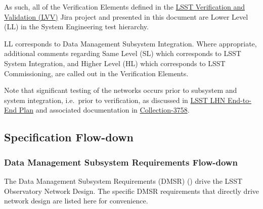 \documentclass[DM,lsstdraft,STS,toc]{lsstdoc}
\begin{document}
As such, all of the Verification Elements defined in the \href{https://jira.lsstcorp.org/projects/LVV/}{LSST Verification and Validation (LVV)} Jira project and presented in this document are Lower Level (LL) in the System Engineering test hierarchy.

LL corresponds to Data Management Subsystem Integration.
Where appropriate, additional comments regarding Same Level (SL) which corresponds to LSST System Integration, and Higher Level (HL) which corresponds to LSST Commissioning, are called out in the Verification Elements.

Note that significant testing of the networks occurs prior to subsystem and system integration, i.e.\  prior to verification, as discussed in \href{https://ls.st/document-14789}{LSST LHN End-to-End Plan} and associated documentation in \href{https://docushare.lsstcorp.org/docushare/dsweb/View/Collection-3758}{Collection-3758}.

\subsection{Specification Flow-down}\label{sec:sepcflowd}

\subsubsection{Data Management Subsystem Requirements Flow-down}\label{sec:dmreqflowd}

The Data Management Subsystem Requirements (DMSR) () drive the LSST Observatory Network Design.
The specific DMSR requirements that directly drive network design are listed here for convenience.
\end{document}
